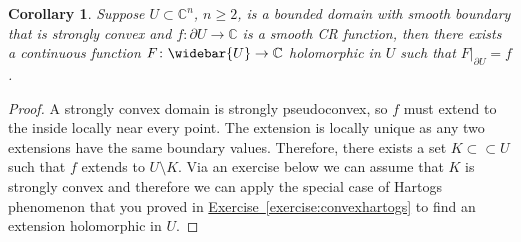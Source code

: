 \documentclass[12pt,openany]{book}
\newcommand{\C}{{\mathbb{C}}}
\theoremstyle{plain}
\newtheorem{cor}[thm]{Corollary}
\theoremstyle{remark}
\theoremstyle{definition}
\theoremstyle{exercise}
\theoremstyle{example}
\newcommand{\exerciseref}[1]{\hyperref[#1]{Exercise~\ref*{#1}}}
\begin{document}
\begin{cor} \label{cor:bochnerhartogsstrconvex}
Suppose $U \subset \C^n$, $n \geq 2$, is a bounded domain with smooth boundary that is
strongly convex 
and $f \colon \partial U \to \C$ is a smooth CR function, then
there exists a continuous function $F \colon \widebar{U} \to \C$
holomorphic in $U$
such that $F|_{\partial U} = f$.
\end{cor}

\begin{proof}
A strongly convex domain is strongly pseudoconvex, so $f$ must extend to the
inside locally near every point.  The extension is locally unique as any two
extensions have the same boundary values.  Therefore, there exists a set
$K \subset \subset U$ such that $f$ extends to $U \setminus K$.
Via an exercise below we can assume that $K$ is strongly convex and
therefore we can apply the special case of Hartogs phenomenon
that you proved in \exerciseref{exercise:convexhartogs} to find an
extension holomorphic in $U$.
\end{proof}
\end{document}
